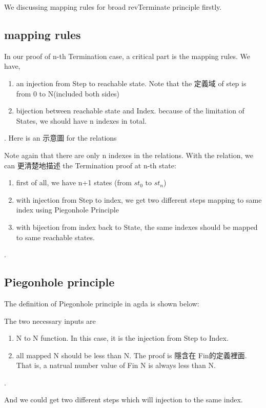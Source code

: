 We discussing mapping rules for broad revTerminate principle firstly.

\subsection{ mapping rules }
In our proof of n-th Termination case, a critical part is the mapping rules.
We have,
\begin{enumerate}[1.]
    \item an injection from Step to reachable state.  Note that the 定義域 of step is from 0 to N(included both sides)
    \item bijection between reachable state and Index. because of the limitation of States, we should have n indexes in total.
\end{enumerate}.
Here is an 示意圖 for the relations


Note again that there are only n indexes in the relations.
With the relation, we can 更清楚地描述 the Termination proof at n-th state:
\begin{enumerate}[1.]
    \item first of all, we have n+1 states (from $st_{0}$ to $st_{n}$)
    \item with injection from Step to index, we get two different steps mapping to same index using Piegonhole Principle
    \item with bijection from index back to State, the same indexes should be mapped to same reachable states.
\end{enumerate}.

\subsection{ Piegonhole principle }
The definition of Piegonhole principle in agda is shown below:



The two necessary inputs are 
\begin{enumerate}[1.]
    \item N to N function. In this case, it is the injection from Step to Index. 
    \item all mapped N should be less than N.  The proof is 隱含在 Fin的定義裡面.  That is, a natrual number value of Fin N is always less than N.
\end{enumerate}.

And we could get two different steps which will injection to the same index.

